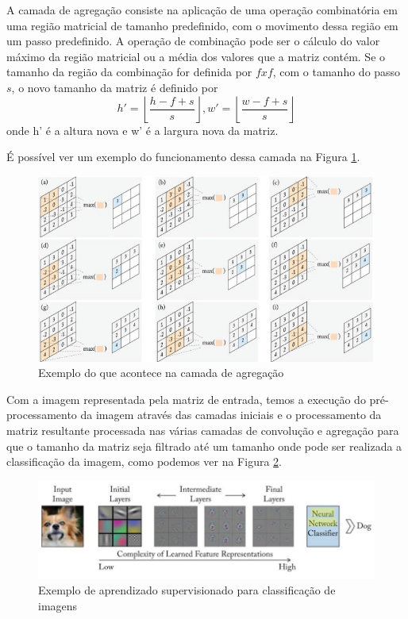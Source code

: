 \documentclass[
	12pt,				%
	openright,			%
	oneside,
	a4paper,			%
	english,			%
	french,				%
	spanish,			%
	brazil				%
	]{abntex2}
\begin{document}
    A camada de agregação consiste na aplicação de uma operação combinatória em uma região matricial de tamanho predefinido, com o movimento dessa região em um passo predefinido. A operação de combinação pode ser o cálculo do valor máximo da região matricial ou a média dos valores que a matriz contém. Se o tamanho da região da combinação for definida por $f x f$, com o tamanho do passo $s$, o novo tamanho da matriz é definido por
        $$h' = \left \lfloor{\frac{h - f + s}{s}} \right \rfloor,   w' = \left \lfloor{\frac{w - f + s}{s}} \right \rfloor$$
    onde h' é a altura nova e w' é a largura nova da matriz.
    
    É possível ver um exemplo do funcionamento dessa camada na Figura \ref{fig_cnn_pool}.
    \begin{figure}[H]
        \caption{\label{fig_cnn_pool}Exemplo do que acontece na camada de agregação}
        \includegraphics[width=\textwidth]{CNN-PoolingLayer.JPG}
    \end{figure}
    
    Com a imagem representada pela matriz de entrada, temos a execução do pré-processamento da imagem através das camadas iniciais e o processamento da matriz resultante processada nas várias camadas de convolução e agregação para que o tamanho da matriz seja filtrado até um tamanho onde pode ser realizada a classificação da imagem, como podemos ver na Figura \ref{fig_cnn_example}.
    
    \begin{figure}[ht]
        \caption{\label{fig_cnn_example}Exemplo de aprendizado supervisionado para classificação de imagens}
        \includegraphics[width=\textwidth]{CNN.JPG}
    \end{figure}
\newpage
\end{document}
